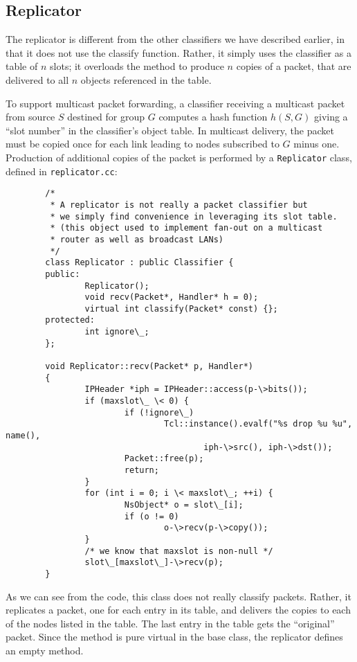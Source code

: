 \subsection{Replicator}
\label{sec:node:replicator}

The replicator is different from the other classifiers
we have described earlier,
in that it does not use the classify function.
Rather, it simply uses the classifier as a table of $n$ slots;
it overloads the  method to produce $n$ copies
of a packet, that are delivered to all $n$ objects referenced in the table.

To support multicast packet forwarding, a classifier receiving a
multicast packet from source $S$
destined for group $G$ computes a hash function $h(S,G)$ giving
a ``slot number'' in the classifier's object table.
In multicast delivery, the packet must be copied once for
each link leading to nodes subscribed to $G$ minus one.
Production of additional copies of the packet is performed
by a {\tt Replicator} class, defined in {\tt replicator.cc}:
\begin{verbatim}
        /*
         * A replicator is not really a packet classifier but
         * we simply find convenience in leveraging its slot table.
         * (this object used to implement fan-out on a multicast
         * router as well as broadcast LANs)
         */
        class Replicator : public Classifier {
        public:
                Replicator();
                void recv(Packet*, Handler* h = 0);
                virtual int classify(Packet* const) {};
        protected:
                int ignore\_;
        };

        void Replicator::recv(Packet* p, Handler*)
        {
                IPHeader *iph = IPHeader::access(p-\>bits());
                if (maxslot\_ \< 0) {
                        if (!ignore\_)
                                Tcl::instance().evalf("%s drop %u %u", name(), 
                                        iph-\>src(), iph-\>dst());
                        Packet::free(p);
                        return;
                }
                for (int i = 0; i \< maxslot\_; ++i) {
                        NsObject* o = slot\_[i];
                        if (o != 0)
                                o-\>recv(p-\>copy());
                }
                /* we know that maxslot is non-null */
                slot\_[maxslot\_]-\>recv(p);
        }
\end{verbatim}
As we can see from the code,
this class  does not really classify packets.
Rather, it replicates a packet, one for each entry in its table,
and delivers the copies to each of the nodes listed in the table.
The last entry in the table gets the ``original'' packet.
Since the  method is pure virtual in the base class,
the replicator defines an empty  method.

